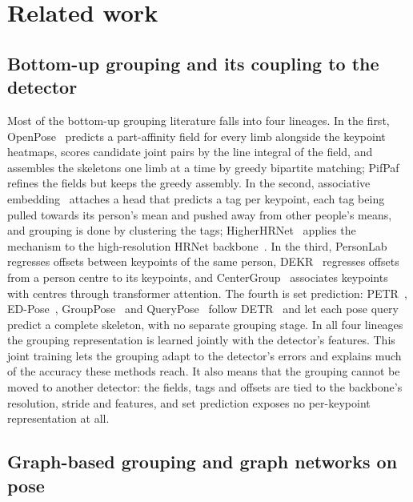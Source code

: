 \section{Related work}
\label{sec:related}

\subsection{Bottom-up grouping and its coupling to the detector}
\label{sec:related_grouping}

Most of the bottom-up grouping literature falls into four lineages.
In the first, OpenPose~\citep{cao2017openpose} predicts a part-affinity field for every limb alongside the keypoint
heatmaps, scores candidate joint pairs by the line integral of the field,
and assembles the skeletons one limb at a time by greedy bipartite matching;
PifPaf~\citep{kreiss2019pifpaf} refines the fields but keeps the greedy assembly.
In the second, associative embedding~\citep{newell2017associative} attaches a head that predicts a tag per keypoint,
each tag being pulled towards its person's mean and pushed away from other people's means,
and grouping is done by clustering the tags;
HigherHRNet~\citep{cheng2020higherhrnet} applies the mechanism to the high-resolution HRNet backbone~\citep{sun2019hrnet}.
In the third, PersonLab~\citep{papandreou2018personlab} regresses offsets between keypoints of the same person,
DEKR~\citep{geng2021dekr} regresses offsets from a person centre to its keypoints,
and CenterGroup~\citep{braso2021centergroup} associates keypoints with centres through transformer attention.
The fourth is set prediction: PETR~\citep{shi2022petr}, ED-Pose~\citep{yang2023edpose},
GroupPose~\citep{liu2023grouppose} and QueryPose~\citep{xiao2022querypose} follow DETR~\citep{carion2020detr}
and let each pose query predict a complete skeleton, with no separate grouping stage.
In all four lineages the grouping representation is learned jointly with the detector's features.
This joint training lets the grouping adapt to the detector's errors
and explains much of the accuracy these methods reach.
It also means that the grouping cannot be moved to another detector:
the fields, tags and offsets are tied to the backbone's resolution, stride and features,
and set prediction exposes no per-keypoint representation at all.

\subsection{Graph-based grouping and graph networks on pose}
\label{sec:related_graph}

